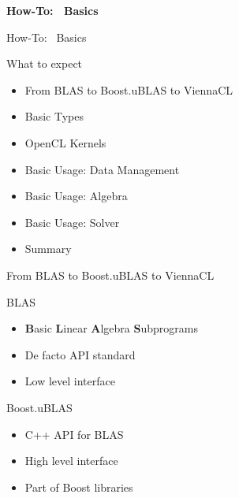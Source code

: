 




\begin{frame}{ }
 \begin{center}
  \Large \textbf{How-To: \ViennaCL \ Basics}
 \end{center}
\end{frame}


\begin{frame}{How-To: \ViennaCL \ Basics}

\begin{block}{What to expect}
  \begin{itemize}
   \item From BLAS to Boost.uBLAS to ViennaCL
   \item Basic Types
   \item OpenCL Kernels
   \item Basic Usage: Data Management
   \item Basic Usage: Algebra
   \item Basic Usage: Solver
   \item Summary
  \end{itemize}
\end{block}

\end{frame}



\begin{frame}{From BLAS to Boost.uBLAS to ViennaCL}

\begin{block}{BLAS}
  \begin{itemize}
   \item \textbf{B}asic \textbf{L}inear \textbf{A}lgebra \textbf{S}ubprograms
   \item De facto API standard
   \item Low level interface
  \end{itemize}
\end{block}

\begin{block}{Boost.uBLAS}
  \begin{itemize}
   \item C++ API for BLAS
   \item High level interface
   \item Part of Boost libraries
  \end{itemize}
\end{block}

\end{frame}



